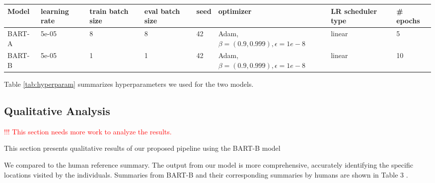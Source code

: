 \begin{table*}[h]
	\caption{Hyperparameters in model retraining}
	\label{tab:hyperparam}
	\begin{center}
				\begin{tabular}{l|l|l|l|l|l|l|l}
							\hline
							Model & learning rate & train batch size & eval batch size &seed & optimizer&LR scheduler type & \# epochs \\
							\hline
							BART-A &  5e-05  &  8 & 8 & 42& Adam, $\beta=(0.9, 0.999), \epsilon=1e-8$& linear & 5 \\
							\hline
							BART-B &  5e-05  &  1 & 1 & 42& Adam, $\beta=(0.9, 0.999), \epsilon=1e-8$& linear & 10 \\
							\hline
						\end{tabular}
			\end{center}
\end{table*}

Table \ref{tab:hyperparam} summarizes hyperparameters we used for the two models. 



\subsection{Qualitative Analysis}

\textcolor{red}{!!! This section needs more work to analyze the results.}

This section presents qualitative results of our proposed pipeline using the BART-B model

We compared to the human reference summary. The output from our model is more comprehensive, accurately identifying the specific locations visited by the individuals. Summaries from BART-B and their corresponding summaries by humans are shown in  Table 3 . 


